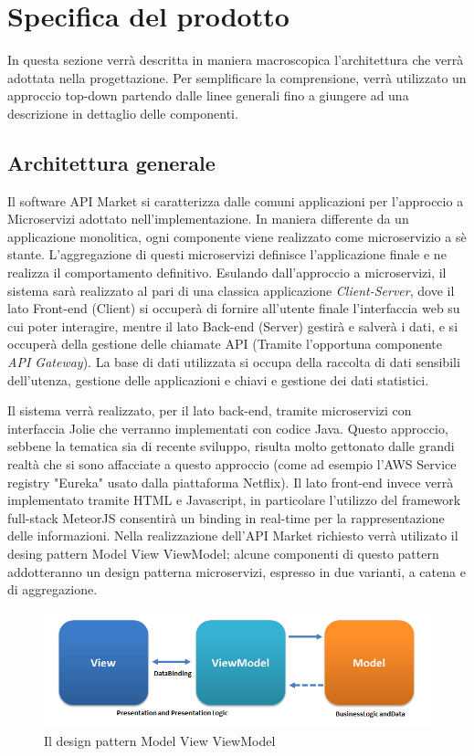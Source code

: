\newpage
\section{Specifica del prodotto}
In questa sezione verrà descritta in maniera macroscopica l'architettura che verrà adottata nella progettazione. Per semplificare la comprensione, verrà utilizzato un approccio top-down partendo dalle linee generali fino a giungere ad una descrizione in dettaglio delle componenti.

\subsection{Architettura generale}
Il software API Market si caratterizza dalle comuni applicazioni per l'approccio a Microservizi adottato nell'implementazione. In maniera differente da un applicazione monolitica, ogni componente viene realizzato come microservizio a sè stante. L'aggregazione di questi microservizi definisce l'applicazione finale e ne realizza il comportamento definitivo. Esulando dall'approccio a microservizi, il sistema sarà realizzato al pari di una classica applicazione \textit{Client-Server}, dove il lato Front-end (Client) si occuperà di fornire all'utente finale l'interfaccia web su cui poter interagire, mentre il lato Back-end (Server) gestirà e salverà i dati, e si occuperà della gestione delle chiamate API (Tramite l'opportuna componente \textit{API Gateway}). La base di dati utilizzata si occupa della raccolta di dati sensibili dell'utenza, gestione delle applicazioni e chiavi e gestione dei dati statistici.

Il sistema verrà realizzato, per il lato back-end, tramite microservizi con interfaccia Jolie che verranno implementati con codice Java. Questo approccio, sebbene la tematica sia di recente sviluppo, risulta molto gettonato dalle grandi realtà che si sono affacciate a questo approccio (come ad esempio l'AWS Service registry "Eureka" usato dalla piattaforma Netflix). Il lato front-end invece verrà implementato tramite HTML e Javascript, in particolare l'utilizzo del framework full-stack MeteorJS consentirà un binding in real-time per la rappresentazione delle informazioni.
Nella realizzazione dell'API Market richiesto verrà utilizato il desing pattern Model View ViewModel; alcune componenti di questo pattern addotteranno un design patterna microservizi, espresso in due varianti, a catena e di aggregazione.
\begin{figure}
	\centering
	\includegraphics{IMG/MVVMPattern}
	\caption{Il design pattern Model View ViewModel}
\end{figure}


